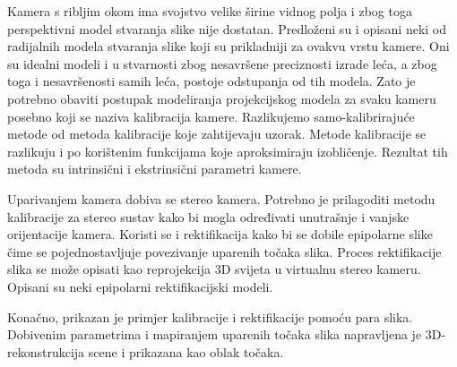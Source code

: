 \documentclass[../seminar.tex]{subfiles}
\begin{document}
Kamera s ribljim okom ima svojstvo velike širine vidnog polja i zbog toga perspektivni model stvaranja slike nije dostatan. Predloženi su i opisani neki od radijalnih modela stvaranja slike koji su prikladniji za ovakvu vrstu kamere. Oni su idealni modeli i u stvarnosti zbog nesavršene preciznosti izrade leća, a zbog toga i nesavršenosti samih leća, postoje odstupanja od tih modela. Zato je potrebno obaviti postupak modeliranja projekcijskog modela za svaku kameru posebno koji se naziva kalibracija kamere. Razlikujemo samo-kalibrirajuće metode od metoda kalibracije koje zahtijevaju uzorak. Metode kalibracije se razlikuju i po korištenim funkcijama koje aproksimiraju izobličenje. Rezultat tih metoda su intrinsični i ekstrinsični parametri kamere. 

Uparivanjem kamera dobiva se stereo kamera. Potrebno je prilagoditi metodu kalibracije za stereo sustav kako bi mogla određivati unutrašnje i vanjske orijentacije kamera. Koristi se i rektifikacija kako bi se dobile epipolarne slike čime se pojednostavljuje povezivanje uparenih točaka slika. Proces rektifikacije slika se može opisati kao reprojekcija 3D svijeta u virtualnu stereo kameru. Opisani su neki epipolarni rektifikacijski modeli.

Konačno, prikazan je primjer kalibracije i rektifikacije pomoću para slika. Dobivenim parametrima i mapiranjem uparenih točaka slika napravljena je 3D-rekonstrukcija scene i prikazana kao oblak točaka. 
\end{document}
